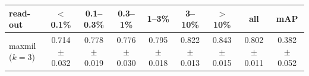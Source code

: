\begin{tabular}{lcccccccc}
\toprule
read-out & $<$0.1\% & 0.1--0.3\% & 0.3--1\% & 1--3\% & 3--10\% & $>$10\% & all & mAP \\
\midrule
maxmil ($k=3$) & 0.714 $\pm$ 0.032 & 0.778 $\pm$ 0.019 & 0.776 $\pm$ 0.030 & 0.795 $\pm$ 0.018 & 0.822 $\pm$ 0.013 & 0.843 $\pm$ 0.015 & 0.802 $\pm$ 0.011 & 0.382 $\pm$ 0.052 \\
\bottomrule
\end{tabular}
